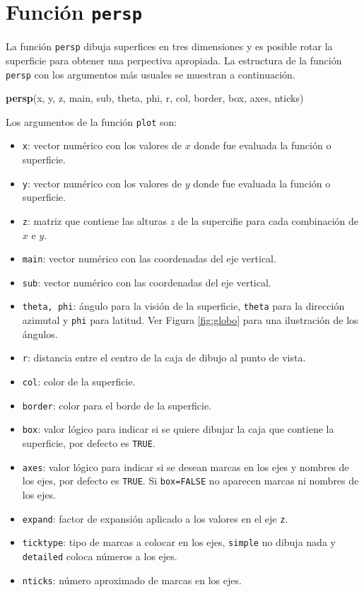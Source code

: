\documentclass[10pt,]{krantz}
\makeatletter
\newenvironment{Shaded}{\begin{snugshade}}{\end{snugshade}}
\newcommand{\KeywordTok}[1]{\textcolor[rgb]{0.13,0.29,0.53}{\textbf{{#1}}}}
\newcommand{\NormalTok}[1]{{#1}}
\providecommand{\tightlist}{%
  \setlength{\itemsep}{0pt}\setlength{\parskip}{0pt}}
\newenvironment{kframe}{%
\medskip{}
\setlength{\fboxsep}{.8em}
 \def\at@end@of@kframe{}%
 \ifinner\ifhmode%
  \def\at@end@of@kframe{\end{minipage}}%
  \begin{minipage}{\columnwidth}%
 \fi\fi%
 \def\FrameCommand##1{\hskip\@totalleftmargin \hskip-\fboxsep
 \colorbox{shadecolor}{##1}\hskip-\fboxsep
     \hskip-\linewidth \hskip-\@totalleftmargin \hskip\columnwidth}%
 \MakeFramed {\advance\hsize-\width
   \@totalleftmargin\z@ \linewidth\hsize
   \@setminipage}}%
 {\par\unskip\endMakeFramed%
 \at@end@of@kframe}
\renewenvironment{Shaded}{\begin{kframe}}{\end{kframe}}
\makeatother
\begin{document}
\section{\texorpdfstring{Función \texttt{persp}
}{Función persp }}\label{funcion-persp}

La función \texttt{persp} dibuja superfices en tres dimensiones y es
posible rotar la superficie para obtener una perpectiva apropiada. La
estructura de la función \texttt{persp} con los argumentos más usuales
se muestran a continuación.

\begin{Shaded}
\begin{Highlighting}[]
\KeywordTok{persp}\NormalTok{(x, y, z, main, sub, theta, phi, r, col, border, box, axes, nticks)}
\end{Highlighting}
\end{Shaded}

Los argumentos de la función \texttt{plot} son:

\begin{itemize}
\tightlist
\item
  \texttt{x}: vector numérico con los valores de \(x\) donde fue
  evaluada la función o superficie.
\item
  \texttt{y}: vector numérico con los valores de \(y\) donde fue
  evaluada la función o superficie.
\item
  \texttt{z}: matriz que contiene las alturas \(z\) de la supercifie
  para cada combinación de \(x\) e \(y\).
\item
  \texttt{main}: vector numérico con las coordenadas del eje vertical.
\item
  \texttt{sub}: vector numérico con las coordenadas del eje vertical.
\item
  \texttt{theta,\ phi}: ángulo para la visión de la superficie,
  \texttt{theta} para la dirección azimutal y \texttt{phi} para latitud.
  Ver Figura \ref{fig:globo} para una ilustración de los ángulos.
\item
  \texttt{r}: distancia entre el centro de la caja de dibujo al punto de
  vista.
\item
  \texttt{col}: color de la superficie.
\item
  \texttt{border}: color para el borde de la superficie.
\item
  \texttt{box}: valor lógico para indicar si se quiere dibujar la caja
  que contiene la superficie, por defecto es \texttt{TRUE}.
\item
  \texttt{axes}: valor lógico para indicar si se desean marcas en los
  ejes y nombres de los ejes, por defecto es \texttt{TRUE}. Si
  \texttt{box=\textquotesingle{}FALSE\textquotesingle{}} no aparecen
  marcas ni nombres de los ejes.
\item
  \texttt{expand}: factor de expansión aplicado a los valores en el eje
  \texttt{z}.
\item
  \texttt{ticktype}: tipo de marcas a colocar en los ejes,
  \texttt{simple} no dibuja nada y \texttt{detailed} coloca números a
  los ejes.
\item
  \texttt{nticks}: número aproximado de marcas en los ejes.
\end{itemize}
\end{document}
